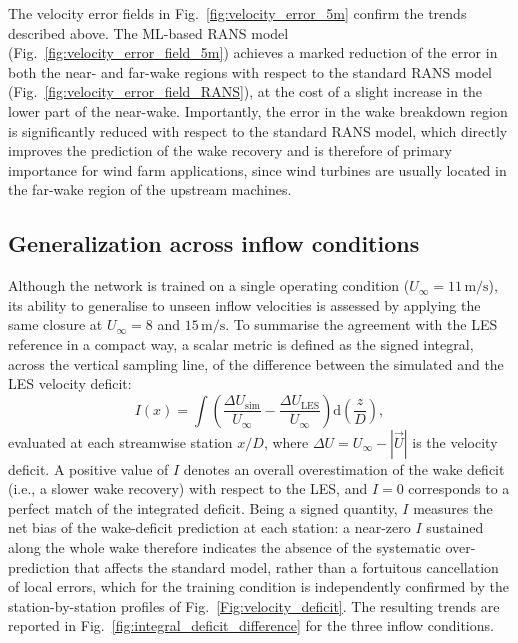 The velocity error fields in Fig.~\ref{fig:velocity_error_5m} confirm the trends described above. The ML-based RANS model (Fig.~\ref{fig:velocity_error_field_5m}) achieves a marked reduction of the error in both the near- and far-wake regions with respect to the standard RANS model (Fig.~\ref{fig:velocity_error_field_RANS}), at the cost of a slight increase in the lower part of the near-wake. Importantly, the error in the wake breakdown region is significantly reduced with respect to the standard RANS model, which directly improves the prediction of the wake recovery and is therefore of primary importance for wind farm applications, since wind turbines are usually located in the far-wake region of the upstream machines.

\subsection{Generalization across inflow conditions}
\label{sec:generalization}
Although the network is trained on a single operating condition ($U_\infty=11\,\mathrm{m/s}$), its ability to generalise to unseen inflow velocities is assessed by applying the same closure at $U_\infty=8$ and $15\,\mathrm{m/s}$. To summarise the agreement with the LES reference in a compact way, a scalar metric is defined as the signed integral, across the vertical sampling line, of the difference between the simulated and the LES velocity deficit:
\begin{equation}
    I(x) = \int \left( \frac{\Delta U_{\mathrm{sim}}}{U_\infty} - \frac{\Delta U_{\mathrm{LES}}}{U_\infty} \right) \mathrm{d}\left(\frac{z}{D}\right),
    \label{eq:integral_deficit_difference}
\end{equation}
evaluated at each streamwise station $x/D$, where $\Delta U = U_\infty - |\vec{U}|$ is the velocity deficit. A positive value of $I$ denotes an overall overestimation of the wake deficit (i.e., a slower wake recovery) with respect to the LES, and $I=0$ corresponds to a perfect match of the integrated deficit. Being a signed quantity, $I$ measures the net bias of the wake-deficit prediction at each station: a near-zero $I$ sustained along the whole wake therefore indicates the absence of the systematic over-prediction that affects the standard model, rather than a fortuitous cancellation of local errors, which for the training condition is independently confirmed by the station-by-station profiles of Fig.~\ref{Fig:velocity_deficit}. The resulting trends are reported in Fig.~\ref{fig:integral_deficit_difference} for the three inflow conditions.
